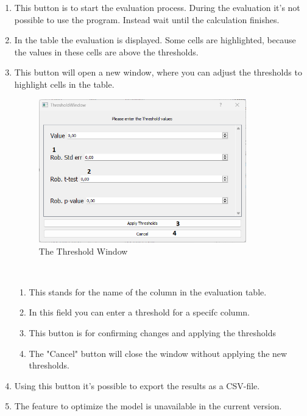\documentclass{article}
\begin{document}
\begin{enumerate} [label=\textbf{\arabic*})]
    \item This button is to start the evaluation process. During the evaluation it's not possible to use the program. Instead wait until the calculation finishes.
    \item In the table the evaluation is displayed. Some cells are highlighted, because the values in these cells are above the thresholds.
    \item This button will open a new window, where you can adjust the thresholds to highlight cells in the table. \\
    \newpage
    \begin{figure}[H]%
        \centering
        \includegraphics[width=9cm]{docs/User Manual/img/thresholdWindow.png}
        \caption{The Threshold Window}
        \label{fig:thresholds} 
    \end{figure} \\
    \begin{enumerate} [label=\textbf{\arabic*})]
        \item This stands for the name of the column in the evaluation table.
        \item In this field you can enter a threshold for a specifc column.
        \item This button is for confirming changes and applying the thresholds
        \item The "Cancel" button will close the window without applying the new thresholds.
    \end{enumerate}
    \item Using this button it's possible to export the results as a CSV-file.
    \item The feature to optimize the model is unavailable in the current version.
\end{enumerate}
\newpage
\end{document}
